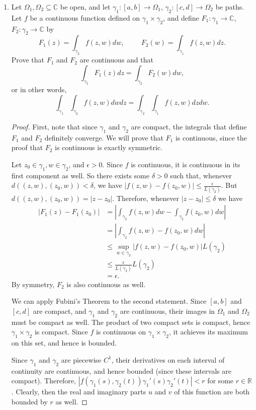 \documentclass[10pt]{article}
\newcommand{\R}{\mathbb{R}}
\newcommand{\C}{\mathbb{C}}
\begin{document}
\begin{enumerate}
\item Let $\Omega_1,\Omega_2 \subseteq \C$ be open, and let $\gamma_1 : [a,b] \rightarrow \Omega_1$, $\gamma_2 : [c,d] \rightarrow \Omega_2$ be paths.  Let $f$ be a continuous function defined on $\gamma_1 \times \gamma_2$, and define $F_1 : \gamma_1 \rightarrow \C$, $F_2: \gamma_2 \rightarrow \C$ by
$$
F_1(z) = \int_{\gamma_2} f(z,w)dw, \hspace{1cm} F_2(w) = \int_{\gamma_1} f(z,w)dz.
$$
Prove that $F_1$ and $F_2$ are continuous and that
$$
\int_{\gamma_1} F_1(z)dz = \int_{\gamma_2} F_2(w) dw,
$$
or in other words,
$$
\int_{\gamma_1}\int_{\gamma_2} f(z,w) dwdz = \int_{\gamma_2}\int_{\gamma_1} f(z,w) dzdw.
$$

\begin{proof}
First, note that since $\gamma_1$ and $\gamma_2$ are compact, the integrals that define $F_1$ and $F_2$ definitely converge.  We will prove that $F_1$ is continuous, since the proof that $F_2$ is continuous is exactly symmetric.

Let $z_0 \in \gamma_1, w \in \gamma_2$, and $\epsilon > 0$.  Since $f$ is continuous, it is continuous in its first component as well.  So there exists some $\delta > 0$ such that, whenever $d((z,w), (z_0, w)) < \delta$, we have $|f(z,w) - f(z_0, w)| \leq \frac{\epsilon}{L(\gamma_2)}$.  But $d((z,w), (z_0, w)) = |z - z_0|$.  Therefore, whenever $|z - z_0| \leq \delta$ we have
\begin{align*}
|F_1(z) - F_1(z_0)| &=
\left| \int_{\gamma_2} f(z,w) dw - \int_{\gamma_2} f(z_0,w) dw \right|
\\
&=
\left| \int_{\gamma_2} f(z,w) - f(z_0,w) dw \right|
\\
&\leq \sup\limits_{w \in \gamma_2} |f(z,w) - f(z_0,w)| L(\gamma_2)
\\
&\leq \frac{\epsilon}{L(\gamma_2)} L(\gamma_2)
\\
&= \epsilon.
\end{align*}
By symmetry, $F_2$ is also continuous as well.

We can apply Fubini's Theorem to the second statement.  Since $[a,b]$ and $[c,d]$ are compact, and $\gamma_1$ and $\gamma_2$ are continuous, their images in $\Omega_1$ and $\Omega_2$ must be compact as well.  The product of two compact sets is compact, hence $\gamma_1 \times \gamma_2$ is compact.  Since $f$ is continuous on $\gamma_1 \times \gamma_2$, it achieves its maximum on this set, and hence is bounded.

Since $\gamma_1$ and $\gamma_2$ are piecewise $C^1$, their derivatives on each interval of continuity are continuous, and hence bounded (since these intervals are compact).  Therefore, $|f(\gamma_1(s),\gamma_2(t)) \gamma_1 ' (s) \gamma_2 ' (t)| < r$ for some $r \in \R$.  Clearly, then the real and imaginary parts $u$ and $v$ of this function are both bounded by $r$ as well.


\end{proof}
\end{enumerate}
\end{document}
